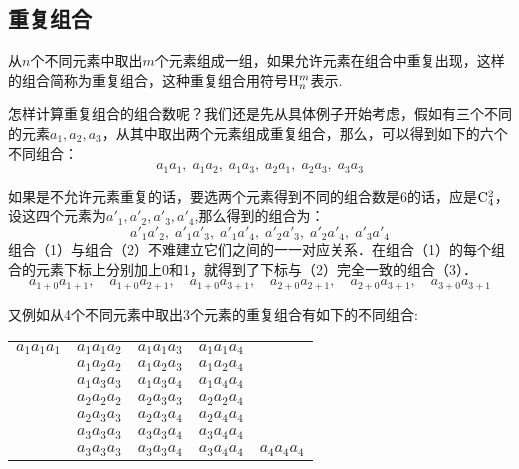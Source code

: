 \subsection{重复组合}
从$n$个不同元素中取出$m$个元素组成一组，如果允许元素在组合中重复出现，这样的组合简称为重复组合，这种重复组合用符号${\rm H}^{m}_{n}$表示.

怎样计算重复组合的组合数呢？我们还是先从具体例子开始考虑，假如有三个不同的元素$a_1,a_2,a_3$，从其中取出两个元素组成重复组合，那么，可以得到如下的六个不同组合：
\begin{equation}
a_1a_1,\; a_1a_2,\; a_1a_3,\; a_2a_1,\; a_2a_3,\; a_3a_3 \tag{1}
\end{equation}

如果是不允许元素重复的话，要选两个元素得到不同的组合数是6的话，应是${\rm C}^{2}_{4}$，设这四个元素为$a'_1,a'_2,a'_3,a'_4$,那么得到的组合为：
\begin{equation}
a'_1a'_2,\; a'_1a'_3,\; a'_1a'_4,\; a'_2a'_3,\; a'_2a'_4,\; a'_3a'_4 \tag{2}
\end{equation}
组合（1）与组合（2）不难建立它们之间的一一对应关系．在组合（1）的每个组合的元素下标上分别加上0和1，就得到了下标与（2）完全一致的组合（3）．
\begin{equation}
a_{1+0}a_{1+1},\quad a_{1+0}a_{2+1},\quad a_{1+0}a_{3+1},\quad a_{2+0}a_{2+1},\quad a_{2+0}a_{3+1},\quad a_{3+0}a_{3+1}
\tag{3}
\end{equation}

又例如从4个不同元素中取出3个元素的重复组合有如下的不同组合:
\begin{center}
\begin{tabular}{ccccc}
    $a_{1}a_{1}a_{1}$&$a_{1}a_{1}a_{2}$&$a_{1}a_1a_{3}$&$a_{1}a_{1}a_{4}$\\
    &$a_{1}a_{2}a_{2}$&$a_{1}a_{2}a_{3}$&$a_{1}a_{2}a_{4}$\\
    &$a_{1}a_{3}a_{3}$&$a_{1}a_{3}a_{4}$&$a_{1}a_{4}a_{4}$\\
    &$a_{2}a_{2}a_{2}$&$a_{2}a_{3}a_{3}$&$a_{2}a_{2}a_{4}$\\
    &$a_{2}a_{3}a_{3}$&$a_{2}a_{3}a_{4}$&$a_{2}a_{4}a_{4}$\\
 &$a_{3}a_{3}a_{3}$&$a_{3}a_{3}a_{4}$&$a_{3}a_{4}a_{4}$\\
   &$a_{3}a_{3}a_{3}$&$a_{3}a_{3}a_{4}$&$a_{3}a_{4}a_{4}$&$a_{4}a_{4}a_{4}$\\ 
\end{tabular}
\end{center}

